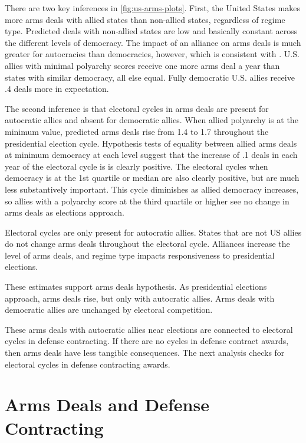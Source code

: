 \documentclass[12pt]{article}
\begin{document}
There are two key inferences in \autoref{fig:us-arms-plots}.
First, the United States makes more arms deals with allied states than non-allied states, regardless of regime type. 
Predicted deals with non-allied states are low and basically constant across the different levels of democracy. 
The impact of an alliance on arms deals is much greater for autocracies than democracies, however, which is consistent with \citep{McManusYarhi-Milo2017}. 
U.S. allies with minimal polyarchy scores receive one more arms deal a year than states with similar democracy, all else equal. 
Fully democratic U.S. allies receive .4 deals more in expectation. 


The second inference is that electoral cycles in arms deals are present for autocratic allies and absent for democratic allies.
When allied polyarchy is at the minimum value, predicted arms deals rise from 1.4 to 1.7 throughout the presidential election cycle.
Hypothesis tests of equality between allied arms deals at minimum democracy at each level suggest that the increase of .1 deals in each year of the electoral cycle is is clearly positive. 
The electoral cycles when democracy is at the 1st quartile or median are also clearly positive, but are much less substantively important.
This cycle diminishes as allied democracy increases, so allies with a polyarchy score at the third quartile or higher see no change in arms deals as elections approach.  


Electoral cycles are only present for autocratic allies. 
States that are not US allies do not change arms deals throughout the electoral cycle. 
Alliances increase the level of arms deals, and regime type impacts responsiveness to presidential elections. 


These estimates support arms deals hypothesis. 
As presidential elections approach, arms deals rise, but only with autocratic allies. 
Arms deals with democratic allies are unchanged by electoral competition.


These arms deals with autocratic allies near elections are connected to electoral cycles in defense contracting. 
If there are no cycles in defense contract awards, then arms deals have less tangible consequences. 
The next analysis checks for electoral cycles in defense contracting awards. 



\section{Arms Deals and Defense Contracting}
\end{document}

